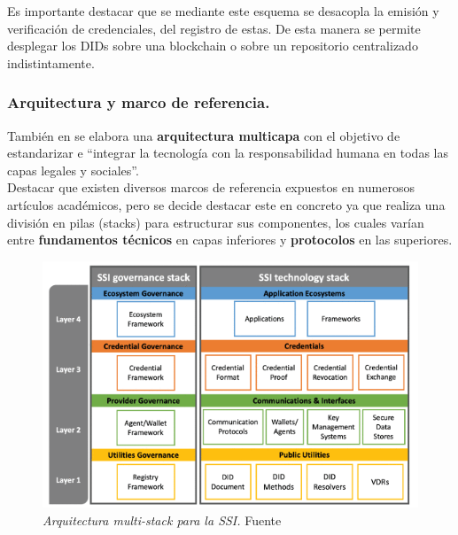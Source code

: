 \documentclass[../main.tex]{subfiles}
\begin{document}
\begin{tcolorbox}[colback=gray!10!white, colframe=gray!50!black, title=Observación \theobservacion]\label{observacion-actores}
Es importante destacar que se mediante este esquema se desacopla la emisión y verificación de credenciales, del registro de estas. De esta manera se permite desplegar los \acrshort{DID}s sobre una blockchain o sobre un repositorio centralizado indistintamente. 
\end{tcolorbox}


\newpage
\subsubsection{Arquitectura y marco de referencia.}\label{Arquitectura y marco de referencia}
También en \cite{ChallengesSSI} se elabora una \textbf{arquitectura multicapa} con el objetivo de estandarizar e ``integrar la tecnología con la responsabilidad humana en todas las capas legales y sociales''. \\
Destacar que existen diversos marcos de referencia expuestos en numerosos artículos académicos, pero se decide destacar este en concreto ya que realiza una división en pilas (stacks) para estructurar sus componentes, los cuales varían entre \textbf{fundamentos técnicos} en capas inferiores y \textbf{protocolos} en las superiores.
\\

\begin{figure}[htbp]
    \centering
    \includegraphics[width=0.75\linewidth]{images/ArquitecturaSSI.png}
    \caption{\textit{Arquitectura multi-stack para la \acrshort{SSI}.} Fuente \cite{ChallengesSSI}}
    \label{fig:ArquitecturaSSI}
\end{figure}
\end{document}
